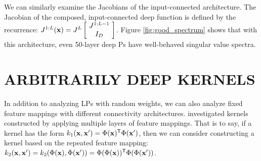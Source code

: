 \documentclass[twoside]{article}
\makeatletter
\newlength{\nonHumbleHeight}
\def\@humbleformat#1{{\settoheight{\nonHumbleHeight}{#1}\resizebox{!}{0.94\nonHumbleHeight}{#1}}}%
\def\humble#1{\@humbleformat{#1}}%
\newcommand{\gp}{{\humble GP}}
\newcommand{\MLP}{{\humble MLP}}
\newcommand{\sectiondist}{}
\makeatother
\begin{document}
We can similarly examine the Jacobians of the input-connected architecture.  
The Jacobian of the composed, input-connected deep function is defined by the recurrence:
%
\newcommand{\sbi}[2]{\left[ \! \begin{array}{c} #1 \\ #2 \end{array} \! \right]} 
$J^{1:L}(\vx) = J^L \sbi{ J^{1:L-1}}{I_D}$.
%
%
%
Figure \ref{fig:good_spectrum} shows that with this architecture, even 50-layer deep \gp{}s have well-behaved singular value spectra.






\section{ARBITRARILY DEEP KERNELS}
\label{sec:deep_kernels}
\sectiondist

In addition to analyzing \MLP{}s with random weights, we can also analyze fixed feature mappings with different connectivity architectures.
\cite{cho2012kernel} investigated kernels constructed by applying multiple layers of feature mappings.  That is to say, if a kernel has the form $k_1({\bf{x}}, {\bf{x}}') = \Phi({\bf{x}}) {^\mathsf{T}} \Phi({\bf{x}}')$, then we can consider constructing a kernel based on the repeated feature mapping: $k_2({\bf{x}}, {\bf{x}}') = k_2(\Phi({\bf{x}}), \Phi({\bf{x}}')) = \Phi(\Phi({\bf{x}})) {^\mathsf{T}} \Phi(\Phi({\bf{x}}'))$.
%
\end{document}
